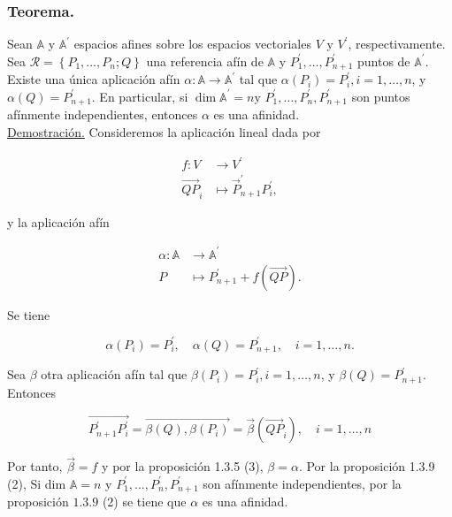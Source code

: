 \documentclass[12pt, a4paper, ones, notitlepage, openany,titlepage]{article}
\begin{document}
\subsubsection{Teorema.} Sean $\mathbb{A}$ y $\mathbb{A}^{\prime}$ espacios afines sobre los espacios vectoriales $V$ y $V^{\prime}$, respectivamente. Sea $\mathcal{R}=\left\{P_{1}, \ldots, P_{n} ; Q\right\}$ una referencia afín de $\mathbb{A}$ y $P_{1}^{\prime}, \ldots, P_{n+1}^{\prime}$ puntos de $\mathbb{A}^{\prime}$. Existe una única aplicación afín $\alpha: \mathbb{A} \rightarrow \mathbb{A}^{\prime}$ tal que $\alpha\left(P_{i}\right)=P_{i}^{\prime}, i=1, \ldots, n$, y $\alpha(Q)=P_{n+1}^{\prime}$. En particular, si $\dim  \mathbb{A}^{\prime}=n \mathrm{y}$ $P_{1}^{\prime}, \ldots, P_{n}^{\prime}, P_{n+1}^{\prime}$ son puntos afínmente independientes, entonces $\alpha$ es una afinidad.\\

\underline{Demostración.} Consideremos la aplicación lineal dada por

$$
\begin{aligned}
f: V & \longrightarrow V^{\prime} \\
\overrightarrow{Q P}_{i} & \longmapsto \vec{P}_{n+1}^{\prime} P_{i}^{\prime},
\end{aligned}
$$

y la aplicación afín

$$
\begin{aligned}
\alpha: \mathbb{A} & \longrightarrow \mathbb{A}^{\prime} \\
P & \longmapsto P_{n+1}^{\prime}+f(\overrightarrow{Q P}) .
\end{aligned}
$$

Se tiene

$$
\alpha\left(P_{i}\right)=P_{i}^{\prime}, \quad \alpha(Q)=P_{n+1}^{\prime}, \quad i=1, \ldots, n .
$$

Sea $\beta$ otra aplicación afín tal que $\beta\left(P_{i}\right)=P_{i}^{\prime}, i=1, \ldots, n$, y $\beta(Q)=P_{n+1}^{\prime}$. Entonces

$$
\overrightarrow{P_{n+1}^{\prime} P_{i}^{\prime}}=\overrightarrow{\beta(Q), \beta\left(P_{i}\right)}=\vec{\beta}\left(\overrightarrow{Q P}_{i}\right), \quad i=1, \ldots, n
$$

Por tanto, $\vec{\beta}=f$ y por la proposición 1.3.5 (3), $\beta=\alpha$. Por la proposición 1.3.9 (2), Si dim $\mathbb{A}=n$ y $P_{1}^{\prime}, \ldots, P_{n}^{\prime}, P_{n+1}^{\prime}$ son afínmente independientes, por la proposición $1.3 .9$ (2) se tiene que $\alpha$ es una afinidad.
\end{document}
